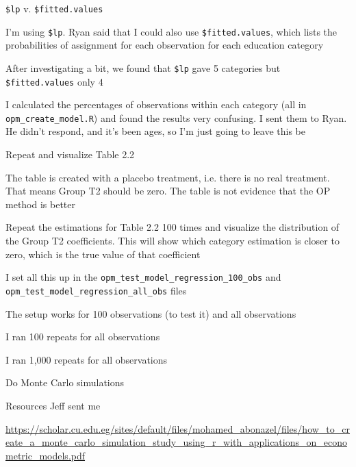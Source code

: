 \documentclass[12pt]{article}
\begin{document}
\begin{coi}
\begin{coi}
			\end{coi}
		\item \texttt{\$lp} v. \texttt{\$fitted.values}
			\begin{coi}
				\item I'm using \texttt{\$lp}. Ryan said that I could also use \texttt{\$fitted.values}, which lists the probabilities of assignment for each observation for each education category
				\item After investigating a bit, we found that \texttt{\$lp} gave 5 categories but \texttt{\$fitted.values} only 4
				\item I calculated the percentages of observations within each category (all in \texttt{opm\_create\_model.R}) and found the results very confusing. I sent them to Ryan. He didn't respond, and it's been ages, so I'm just going to leave this be
			\end{coi}
		\item Repeat and visualize Table 2.2
			\begin{coi}
				\item The table is created with a placebo treatment, i.e. there is no real treatment. That means Group T2 should be zero. The table is not evidence that the OP method is better
				\item Repeat the estimations for Table 2.2 100 times and visualize the distribution of the Group T2 coefficients. This will show which category estimation is closer to zero, which is the true value of that coefficient
				\item I set all this up in the \texttt{opm\_test\_model\_regression\_100\_obs} and\\ \texttt{opm\_test\_model\_regression\_all\_obs} files
				\item The setup works for 100 observations (to test it) and all observations
				\item I ran 100 repeats for all observations
				\item I ran 1,000 repeats for all observations
			\end{coi} 
		\item Do Monte Carlo simulations
			\begin{coi}
				\item Resources Jeff sent me
					\begin{coi}
						\item \href{https://scholar.cu.edu.eg/sites/default/files/mohamed_abonazel/files/how_to_create_a_monte_carlo_simulation_study_using_r_with_applications_on_econometric_models.pdf}{https://scholar.cu.edu.eg/sites/default/files/mohamed\_abonazel/files/how\_to\_create\_a\_monte\_carlo\_simulation\_study\_using\_r\_with\_applications\_on\_econometric\_models.pdf}

\end{coi}
\end{coi}
\end{coi}
\end{document}
